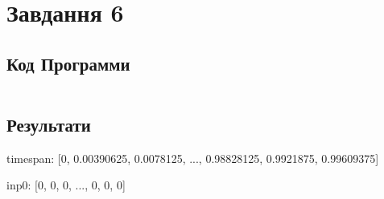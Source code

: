 \section{Завдання 6}
\label{sec:task6}

\subsection{Код Программи}
\label{subsec:task6_code}
\inputminted{python}{../src/task6.py}

\subsection{Результати}
\label{subsec:task6_results}

timespan:
[0, 0.00390625, 0.0078125, ..., 0.98828125, 0.9921875, 0.99609375]

inp0:
[0, 0, 0, ..., 0, 0, 0]
